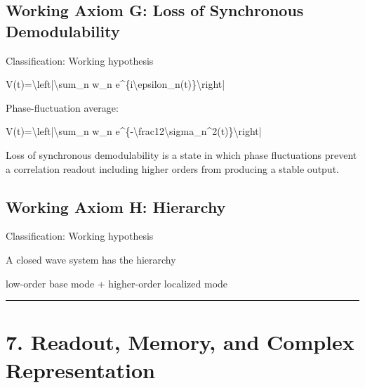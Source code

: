\documentclass[
  a4paper]{article}
\newenvironment{Shaded}{}{}
\newcommand{\NormalTok}[1]{#1}
\begin{document}
\subsection{Working Axiom G: Loss of Synchronous
Demodulability}\label{working-axiom-g-loss-of-synchronous-demodulability}

Classification: Working hypothesis

\begin{Shaded}
\begin{Highlighting}[]
\NormalTok{V(t)=\textbackslash{}left|\textbackslash{}sum\_n w\_n e\^{}\{i\textbackslash{}epsilon\_n(t)\}\textbackslash{}right|}
\end{Highlighting}
\end{Shaded}

Phase-fluctuation average:

\begin{Shaded}
\begin{Highlighting}[]
\NormalTok{V(t)=\textbackslash{}left|\textbackslash{}sum\_n w\_n e\^{}\{{-}\textbackslash{}frac12\textbackslash{}sigma\_n\^{}2(t)\}\textbackslash{}right|}
\end{Highlighting}
\end{Shaded}

Loss of synchronous demodulability is a state in which phase
fluctuations prevent a correlation readout including higher orders from
producing a stable output.

\subsection{Working Axiom H: Hierarchy}\label{working-axiom-h-hierarchy}

Classification: Working hypothesis

A closed wave system has the hierarchy

\begin{Shaded}
\begin{Highlighting}[]
\NormalTok{low{-}order base mode}
\NormalTok{+ higher{-}order localized mode}
\end{Highlighting}
\end{Shaded}

\begin{center}\rule{0.5\linewidth}{0.5pt}\end{center}

\section{7. Readout, Memory, and Complex
Representation}\label{readout-memory-and-complex-representation}
\end{document}
